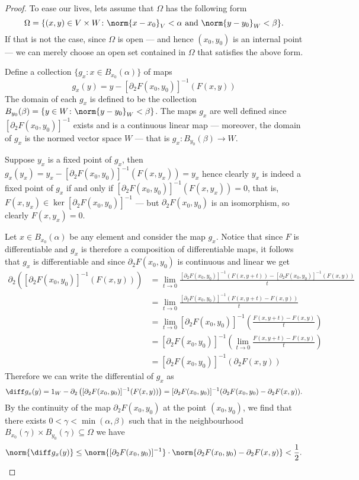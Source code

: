 \begin{proof}
To ease our lives, lets assume that \(\Omega\) has the following form
\[
  \Omega = \{(x, y) \in V \times W \colon \norm{x - x_{0}}_{V} < \alpha
  \text{ and } \norm{y - y_0}_W < \beta\}.
\]
If that is not the case, since \(\Omega\) is open --- and hence \((x_{0}, y_0)\) is
an internal point --- we can merely choose an open set contained in \(\Omega\) that
satisfies the above form.

Define a collection \(\{g_{x} \colon x \in B_{x_0}(\alpha)\}\) of maps
\[
  g_{x}(y) = y - [\partial_2F(x_0, y_0)]^{-1} (F(x, y))
\]
The domain of each \(g_x\) is defined to be the collection \(B_{y_0}(\beta) = \{y
\in W \colon \norm{y - y_0}_W < \beta\}\). The maps \(g_{x}\) are well defined since
\([\partial_2F(x_0, y_0)]^{-1}\) exists and is a continuous linear map --- moreover, the
domain of \(g_x\) is the normed vector space \(W\) --- that is \(g_x: B_{y_0}(\beta) \to
W\).

Suppose \(y_x\) is a fixed point of \(g_x\), then \(g_x(y_x) = y_x -
[\partial_2F(x_0, y_0)]^{-1}(F(x, y_x)) = y_{x}\) hence clearly \(y_x\) is indeed a
fixed point of \(g_x\) if and only if \([\partial_2F(x_0, y_0)]^{-1}(F(x, y_x)) =
0\), that is, \(F(x, y_x) \in \ker [\partial_2F(x_0, y_0)]^{-1}\) --- but \(\partial_2 F(x_0,
y_0)\) is an isomorphism, so clearly \(F(x, y_x) = 0\).

Let \(x \in B_{x_0}(\alpha)\) be any element and consider the map \(g_x\). Notice
that since \(F\) is differentiable and \(g_{x}\) is therefore a composition of
differentiable maps, it follows that \(g_x\) is differentiable and since \(\partial_2
F(x_0, y_0)\) is continuous and linear we get
\begin{align*}
  \partial_2 \left( [\partial_2F(x_0, y_0)]^{-1}(F(x, y)) \right)
  &= \lim_{t \to 0} \frac{[\partial_{2}F(x_0, y_0)]^{-1}(F(x, y + t)) - [\partial_2F(x_0,
    y_0)]^{-1}(F(x, y))}{t}
  \\
  &= \lim_{t \to 0} \frac{[\partial_2F(x_0, y_{0})]^{-1}(F(x, y + t) - F(x, y))}{t}
  \\
  &= \lim_{t \to 0} [\partial_2F(x_0, y_0)]^{-1}
    \left( \frac{F(x, y + t) - F(x, y)}{t} \right)
  \\
  &= [\partial_2F(x_0, y_0)]^{-1}
    \left( \lim_{t \to 0} \frac{F(x, y + t) - F(x, y)}{t} \right)
  \\
  &= [\partial_{2}F(x_0, y_0)]^{-1}(\partial_2 F(x, y))
\end{align*}
Therefore we can write the differential of \(g_{x}\) as
\[
  \diff g_x(y) = 1_W - \partial_{2}\left([\partial_2F(x_0, y_0)]^{-1}(F(x, y))\right)
  = [\partial_2F(x_0, y_0)]^{-1}(\partial_2F(x_0, y_0) - \partial_2F(x, y)).
\]
By the continuity of the map \(\partial_2F(x_0, y_0)\) at the point \((x_0, y_0)\),
we find that there exists \(0 < \gamma < \min(\alpha, \beta)\) such that in the neighbourhood
\(B_{x_0}(\gamma) \times B_{y_0}(\gamma) \subseteq \Omega\) we have
\[
  \norm{\diff g_x(y)} \leq \norm{[\partial_{2}F(x_0, y_0)]^{-1}} \cdot \norm{\partial_2F(x_0, y_0) -
    \partial_2F(x, y)} < \frac{1}{2}.
\]


\end{proof}
